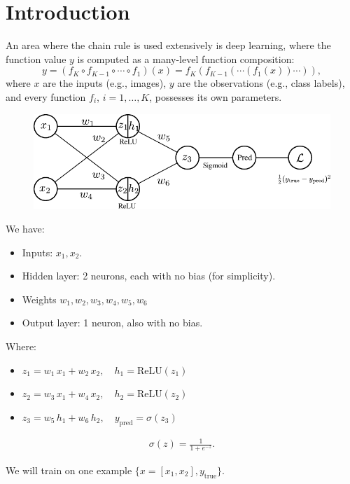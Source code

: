 \section{Introduction}
An area where the chain rule is used extensively is deep learning, where the function value \( y \) is computed as a many-level function composition:
\[ 
y = (f_K \circ f_{K-1} \circ \cdots \circ f_1)(x) = f_K(f_{K-1}(\cdots (f_1(x)) \cdots )),
\]
where \( x \) are the inputs (e.g., images), \( y \) are the observations (e.g., class labels), and every function \( f_i \), \( i = 1, \ldots, K \), possesses its own parameters.

\begin{figure}[h]
	\centering
	\includegraphics[scale=1.0]{./images/backprop.pdf}
\end{figure}

We have:

\begin{itemize}
	\item Inputs: $x_1, x_2$.
	\item Hidden layer: 2 neurons, each with no bias (for simplicity).  
	\item Weights $w_1, w_2, w_3, w_4, w_5, w_6$
	\item Output layer: 1 neuron, also with no bias.  
\end{itemize}

Where:
\begin{itemize}
	\item $z_1 = w_1 \, x_1 + w_2 \, x_2,\quad h_1 = \text{ReLU}(z_1)$
	\item $z_2 = w_3 \, x_1 + w_4 \, x_2,\quad h_2 = \text{ReLU}(z_2)$
	\item $z_3 = w_5 \, h_1 + w_6 \, h_2,\quad y_{\text{pred}} = \sigma(z_3)$
\end{itemize}

\begin{align*}
	\sigma(z) = \frac{1}{1 + e^{-z}}.
\end{align*}

We will train on one example $\{x=[x_1, x_2], y_\text{true}\}$.

